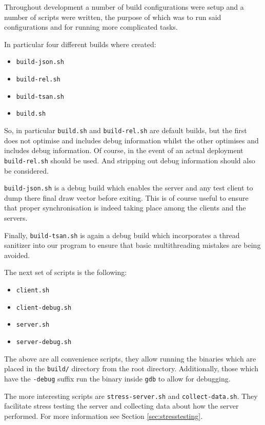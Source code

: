 \documentclass[article]{uom-coursework}
\begin{document}
Throughout development a number of build configurations were
setup and a number of scripts were written, the purpose of which
was to run said configurations and for running more complicated
tasks.

In particular four different builds where created:

\begin{itemize}
    \item \texttt{build-json.sh}
    \item \texttt{build-rel.sh}
    \item \texttt{build-tsan.sh}
    \item \texttt{build.sh}
\end{itemize}

So, in particular \texttt{build.sh} and \texttt{build-rel.sh}
are default builds, but the first does not optimise and includes
debug information whilst the other optimises and includes debug
information. Of course, in the event of an actual deployment
\texttt{build-rel.sh} should be used. And stripping out debug
information should also be considered.

\texttt{build-json.sh} is a debug build which enables the server
and any test client to dump there final draw vector before
exiting. This is of course useful to ensure that proper
synchronisation is indeed taking place among the clients and the
servers.

Finally, \texttt{build-tsan.sh} is again a debug build which
incorporates a thread sanitizer into our program to ensure that
basic multithreading mistakes are being avoided.

The next set of scripts is the following:

\begin{itemize}
    \item \texttt{client.sh}
    \item \texttt{client-debug.sh}
    \item \texttt{server.sh}
    \item \texttt{server-debug.sh}
\end{itemize}

The above are all convenience scripts, they allow running the
binaries which are placed in the \texttt{build/} directory from
the root directory. Additionally, those which have the
\texttt{-debug} suffix run the binary inside \texttt{gdb} to
allow for debugging.

The more interesting scripts are \texttt{stress-server.sh} and
\texttt{collect-data.sh}. They facilitate stress testing the
server and collecting data about how the server performed. For
more information see Section \ref{sec:stresstesting}.
\end{document}
